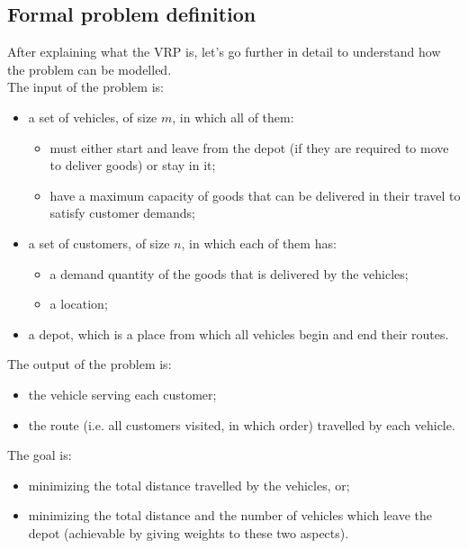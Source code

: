 \documentclass[../main.tex]{subfiles}
\begin{document}
\subsection{Formal problem definition}
\label{subsec:formal-problem-definition}
After explaining what the VRP is, let's go further in detail to understand how the problem can be modelled.\\
The input of the problem is:
\begin{itemize}
    \item a set of vehicles, of size $m$, in which all of them:
    \begin{itemize}
        \item must either start and leave from the depot (if they are required to move to deliver goods) or stay in it;
        \item have a maximum capacity of goods that can be delivered in their travel to satisfy customer demands;
    \end{itemize}
    \item a set of customers, of size $n$, in which each of them has:
    \begin{itemize}
        \item a demand quantity of the goods that is delivered by the vehicles;
        \item a location;
    \end{itemize}
    \item a depot, which is a place from which all vehicles begin and end their routes.
\end{itemize}
The output of the problem is:
\begin{itemize}
    \item the vehicle serving each customer;
    \item the route (i.e. all customers visited, in which order) travelled by each vehicle.
\end{itemize}
The goal is:
\begin{itemize}
    \item minimizing the total distance travelled by the vehicles, or;
    \item minimizing the total distance and the number of vehicles which leave the depot (achievable by giving weights to these two aspects).
\end{itemize}
\end{document}

